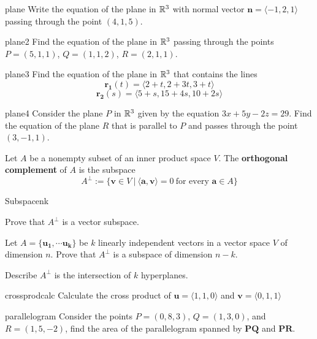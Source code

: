 \begin{problem}{plane}
    Write the equation of the plane in $\mathbb{R}^3$ with normal vector $\bm{n} = \langle-1,2,1\rangle$ passing through the point $(4,1,5)$.
\end{problem}

\begin{problem}{plane2}
    Find the equation of the plane in $\mathbb{R}^3$  passing through the points $P = (5,1,1)$, $Q = (1,1,2)$, $R = (2,1,1)$.
\end{problem}

\begin{problem}{plane3}
    Find the equation of the plane in $\mathbb{R}^3$ that contains the lines $$\bm{r_1}(t)= \langle 2 + t, 2 + 3t, 3+ t \rangle$$ $$\bm{r_2}(s)= \langle 5 + s, 15 + 4s, 10 + 2s \rangle$$
\end{problem}

\begin{problem}{plane4}
    Consider the plane $P$ in $\mathbb{R}^3$ given by the equation $3x + 5y-2z = 29$. Find the equation of the plane $R$ that is parallel to $P$ and passes through the point $(3,-1,1)$.
\end{problem}


\begin{definition}
    Let $A$ be a nonempty subset of an inner product space $V$.  The \textbf{orthogonal complement} of $A$ is the subspace
    $$A^\bot := \{\bm{v} \in V \ | \ \langle \bm{a}, \bm{v} \rangle = 0 \ \text{for every } \bm{a} \in A \}$$
    \end{definition}

\begin{problem}{Subspacenk}
    
    
    Prove that $A^\bot$ is a vector subspace.  
    
    
    Let $A = \{\bm{u_1}, \cdots \bm{u_k}\}$ be $k$ linearly independent vectors in a vector space $V$ of dimension $n$. Prove that $A^\bot$ is a subspace of dimension $n-k$.
    
    Describe $A^\bot$ is the intersection of $k$ hyperplanes.
    
\end{problem}

\begin{problem}{crossprodcalc}
    Calculate the cross product of $\bm{u} = \langle 1,1,0\rangle$ and $\bm{v} = \langle 0,1,1\rangle$
\end{problem}

\begin{problem}{parallelogram}
    Consider the points $P= (0,8,3)$, $Q= (1,3,0)$, and $R= (1,5,-2)$, find the area of the parallelogram spanned by   $\bm{PQ}$ and  $\bm{PR}$.
\end{problem}

